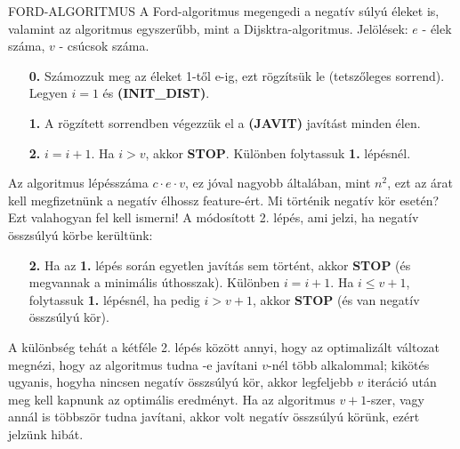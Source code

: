 \begin{tetel}{FORD-ALGORITMUS}
A Ford-algoritmus megengedi a negatív súlyú éleket is, valamint az algoritmus egyszerűbb, mint a Dijsktra-algoritmus. Jelölések: $e$ - élek száma, $v$ - csúcsok száma.
\begin{itemize}
\item[\textbf{0.}] Számozzuk meg az éleket 1-től e-ig, ezt rögzítsük le (tetszőleges sorrend). Legyen $i = 1$ és \textbf{(INIT\_DIST)}.
\item[\textbf{1.}] A rögzített sorrendben végezzük el a \textbf{(JAVIT)} javítást minden élen.
\item[\textbf{2.}] $i = i + 1$. Ha $i > v$, akkor \textbf{STOP}. Különben folytassuk \textbf{1.} lépésnél.
\end{itemize}
Az algoritmus lépésszáma $c\cdot e\cdot v$, ez jóval nagyobb általában, mint $n^2$, ezt az árat kell megfizetnünk a negatív élhossz feature-ért. Mi történik negatív kör esetén? Ezt valahogyan fel kell ismerni! A módosított 2. lépés, ami jelzi, ha negatív összsúlyú körbe kerültünk:
\begin{itemize}
\item[\textbf{2.}] Ha az \textbf{1.} lépés során egyetlen javítás sem történt, akkor \textbf{STOP} (és megvannak a minimális úthosszak). Különben $i = i + 1$. Ha $i \leq v + 1$, folytassuk \textbf{1.} lépésnél, ha pedig $i > v + 1$, akkor \textbf{STOP} (és van negatív összsúlyú kör).
\end{itemize}

A különbség tehát a kétféle 2. lépés között annyi, hogy az optimalizált változat megnézi, hogy az algoritmus tudna -e javítani $v$-nél több alkalommal; kikötés ugyanis, hogyha nincsen negatív összsúlyú kör, akkor legfeljebb $v$ iteráció után meg kell kapnunk az optimális eredményt. Ha az algoritmus $v+1$-szer, vagy annál is többször tudna javítani, akkor volt negatív összsúlyú körünk, ezért jelzünk hibát.
\end{tetel}

